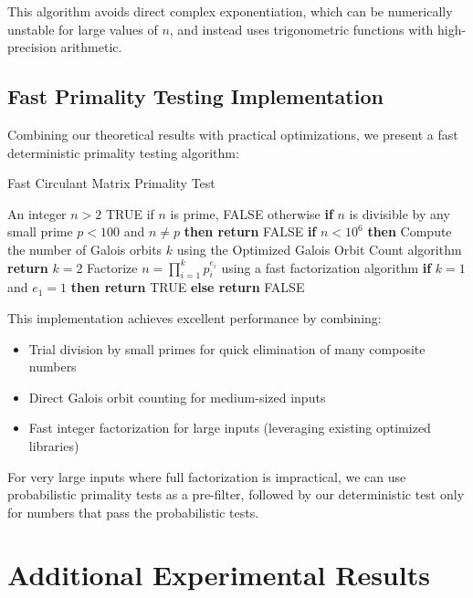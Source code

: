 This algorithm avoids direct complex exponentiation, which can be numerically unstable for large values of $n$, and instead uses trigonometric functions with high-precision arithmetic.

\subsection{Fast Primality Testing Implementation}

Combining our theoretical results with practical optimizations, we present a fast deterministic primality testing algorithm:

\begin{algorithm}
\caption{Fast Circulant Matrix Primality Test}
\begin{algorithmic}[1]
\REQUIRE An integer $n > 2$
\ENSURE TRUE if $n$ is prime, FALSE otherwise
\STATE \textbf{if} $n$ is divisible by any small prime $p < 100$ and $n \neq p$ \textbf{then return} FALSE
\STATE \textbf{if} $n < 10^6$ \textbf{then}
    \STATE \quad Compute the number of Galois orbits $k$ using the Optimized Galois Orbit Count algorithm
    \STATE \quad \textbf{return} $k = 2$
\ELSE
    \STATE \quad Factorize $n = \prod_{i=1}^k p_i^{e_i}$ using a fast factorization algorithm
    \STATE \quad \textbf{if} $k = 1$ and $e_1 = 1$ \textbf{then return} TRUE \textbf{else return} FALSE
\ENDIF
\end{algorithmic}
\end{algorithm}

This implementation achieves excellent performance by combining:
\begin{itemize}
    \item Trial division by small primes for quick elimination of many composite numbers
    \item Direct Galois orbit counting for medium-sized inputs
    \item Fast integer factorization for large inputs (leveraging existing optimized libraries)
\end{itemize}

For very large inputs where full factorization is impractical, we can use probabilistic primality tests as a pre-filter, followed by our deterministic test only for numbers that pass the probabilistic tests.

\section{Additional Experimental Results}

